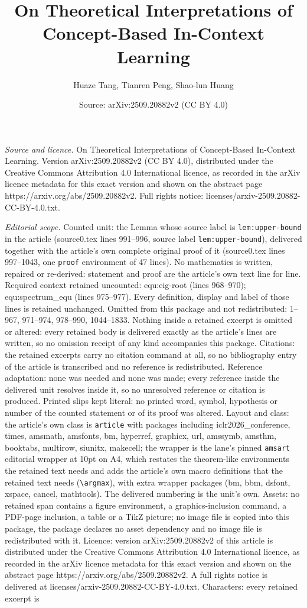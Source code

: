 \documentclass[10pt,a4paper]{amsart}
\title[On Theoretical Interpretations of Concept-Based In-Context L]{On Theoretical Interpretations of Concept-Based In-Context Learning}
\author{Huaze Tang, Tianren Peng, Shao-lun Huang}
\date{Source: arXiv:2509.20882v2 (CC BY 4.0)}
\begin{document}
\maketitle

\noindent\emph{Source and licence.} On Theoretical Interpretations of Concept-Based In-Context Learning. Version arXiv:2509.20882v2 (CC BY 4.0), distributed under the Creative Commons Attribution 4.0 International licence, as recorded in the arXiv licence metadata for this exact version and shown on the abstract page https://arxiv.org/abs/2509.20882v2. Full rights notice: licenses/arxiv-2509.20882-CC-BY-4.0.txt.\par\smallskip

\noindent\textit{Editorial scope.} Counted unit: the Lemma whose source label is \texttt{lem:upper-bound} in the article (source0.tex lines 991--996, source label \texttt{lem:upper-bound}), delivered together with the article's own complete original proof of it (source0.tex lines 997--1043, one \texttt{proof} environment of 47 lines). No mathematics is written, repaired or re-derived: statement and proof are the article's own text line for line. Required context retained uncounted: equ:eig-root (lines 968--970); equ:spectrum\_equ (lines 975--977). Every definition, display and label of those lines is retained unchanged. Omitted from this package and not redistributed: 1--967, 971--974, 978--990, 1044--1833. Nothing inside a retained excerpt is omitted or altered: every retained body is delivered exactly as the article's lines are written, so no omission receipt of any kind accompanies this package. Citations: the retained excerpts carry no citation command at all, so no bibliography entry of the article is transcribed and no reference is redistributed. Reference adaptation: none was needed and none was made; every reference inside the delivered unit resolves inside it, so no unresolved reference or citation is produced. Printed slips kept literal: no printed word, symbol, hypothesis or number of the counted statement or of its proof was altered. Layout and class: the article's own class is \texttt{article} with packages including iclr2026\_conference, times, amsmath, amsfonts, bm, hyperref, graphicx, url, amssymb, amsthm, booktabs, multirow, siunitx, makecell; the wrapper is the lane's pinned \texttt{amsart} editorial wrapper at 10pt on A4, which restates the theorem-like environments the retained text needs and adds the article's own macro definitions that the retained text needs (\texttt{\textbackslash argmax}), with extra wrapper packages (bm, bbm, dsfont, xspace, cancel, mathtools). The delivered numbering is the unit's own. Assets: no retained span contains a figure environment, a graphics-inclusion command, a PDF-page inclusion, a table or a TikZ picture; no image file is copied into this package, the package declares no asset dependency and no image file is redistributed with it. Licence: version arXiv:2509.20882v2 of this article is distributed under the Creative Commons Attribution 4.0 International licence, as recorded in the arXiv licence metadata for this exact version and shown on the abstract page https://arxiv.org/abs/2509.20882v2. A full rights notice is delivered at licenses/arxiv-2509.20882-CC-BY-4.0.txt. Characters: every retained excerpt is 
\end{document}
